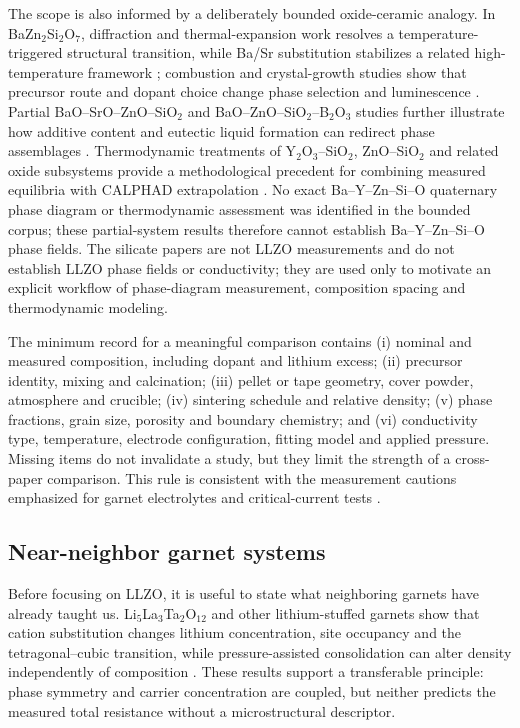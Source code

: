 The scope is also informed by a deliberately bounded oxide-ceramic analogy. In BaZn$_2$Si$_2$O$_7$, diffraction and thermal-expansion work resolves a temperature-triggered structural transition, while Ba/Sr substitution stabilizes a related high-temperature framework \cite{lin1999phase,thieme2015ba1}; combustion and crystal-growth studies show that precursor route and dopant choice change phase selection and luminescence \cite{yao2011synthesis,yao2011crystal}. Partial BaO--SrO--ZnO--SiO$_2$ and BaO--ZnO--SiO$_2$--B$_2$O$_3$ studies further illustrate how additive content and eutectic liquid formation can redirect phase assemblages \cite{thieme2018effect,chen2010phase}. Thermodynamic treatments of Y$_2$O$_3$--SiO$_2$, ZnO--SiO$_2$ and related oxide subsystems provide a methodological precedent for combining measured equilibria with CALPHAD extrapolation \cite{makrovets2023y2o3,shevchenko2019thermodynamic,konar2020a}. No exact Ba--Y--Zn--Si--O quaternary phase diagram or thermodynamic assessment was identified in the bounded corpus; these partial-system results therefore cannot establish Ba--Y--Zn--Si--O phase fields. The silicate papers are not LLZO measurements and do not establish LLZO phase fields or conductivity; they are used only to motivate an explicit workflow of phase-diagram measurement, composition spacing and thermodynamic modeling.

The minimum record for a meaningful comparison contains (i) nominal and measured composition, including dopant and lithium excess; (ii) precursor identity, mixing and calcination; (iii) pellet or tape geometry, cover powder, atmosphere and crucible; (iv) sintering schedule and relative density; (v) phase fractions, grain size, porosity and boundary chemistry; and (vi) conductivity type, temperature, electrode configuration, fitting model and applied pressure. Missing items do not invalidate a study, but they limit the strength of a cross-paper comparison. This rule is consistent with the measurement cautions emphasized for garnet electrolytes and critical-current tests \cite{zhao2024review,wang2024review,klimpel2023standardizing}.

\subsection{Near-neighbor garnet systems}
\label{sec:near-neighbor}

Before focusing on LLZO, it is useful to state what neighboring garnets have already taught us. Li$_5$La$_3$Ta$_2$O$_{12}$ and other lithium-stuffed garnets show that cation substitution changes lithium concentration, site occupancy and the tetragonal--cubic transition, while pressure-assisted consolidation can alter density independently of composition \cite{zhao2018enhancement,cao2019modeling,puente2021garnet}. These results support a transferable principle: phase symmetry and carrier concentration are coupled, but neither predicts the measured total resistance without a microstructural descriptor.

